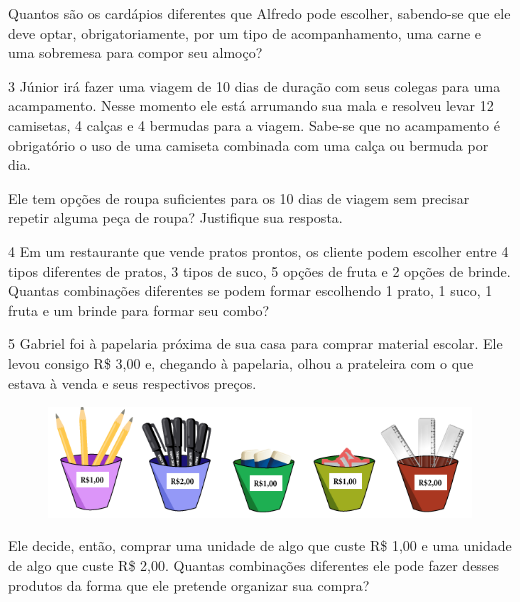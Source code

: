 Quantos são os cardápios diferentes que Alfredo pode escolher, sabendo-se
que ele deve optar, obrigatoriamente, por um tipo de acompanhamento, uma
carne e uma sobremesa para compor seu almoço?


\num{3} Júnior irá fazer uma viagem de 10 dias de duração com seus colegas
para uma acampamento. Nesse momento ele está arrumando sua mala e
resolveu levar 12 camisetas, 4 calças e 4 bermudas para a viagem.
Sabe-se que no acampamento é obrigatório o uso de uma camiseta combinada
com uma calça ou bermuda por dia.

Ele tem opções de roupa suficientes para os 10 dias de viagem sem
precisar repetir alguma peça de roupa? Justifique sua resposta.

\bigskip\bigskip

\num{4} Em um restaurante que vende pratos prontos, os cliente podem escolher entre 4 tipos diferentes de pratos, 3 tipos de suco, 5 opções de fruta e 2 opções de brinde. Quantas combinações diferentes se podem formar escolhendo 1 prato, 1 suco, 1 fruta e um brinde para
formar seu combo?

\bigskip\bigskip\bigskip\bigskip

\num{5} Gabriel foi à papelaria próxima de sua casa para comprar material
escolar. Ele levou consigo R\$ 3,00 e, chegando à papelaria, olhou a
prateleira com o que estava à venda e seus respectivos preços.

\begin{figure}[htpb!]
\includegraphics[width=\textwidth]{../ilustracoes/MAT5/SAEB_5ANO_MAT_figura83.png}
\end{figure}

Ele decide, então, comprar uma unidade de algo que custe R\$ 1,00 e uma unidade de
algo que custe R\$ 2,00. Quantas combinações diferentes ele pode fazer
desses produtos da forma que ele pretende organizar sua compra?

